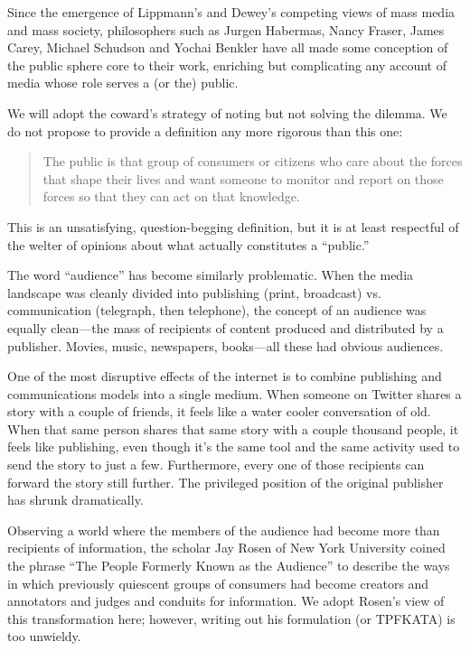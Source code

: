 Since the emergence of Lippmann’s and Dewey’s competing views of mass media
and mass society, philosophers such as Jurgen Habermas, Nancy Fraser, James
Carey, Michael Schudson and Yochai Benkler have all made some conception of
the public sphere core to their work, enriching but complicating any account of
media whose role serves a (or the) public.

We will adopt the coward’s strategy of noting but not solving the dilemma.
We do not propose to provide a definition any more rigorous than this one:

\begin{quote}The public is that group of consumers or citizens who care about the
forces that shape their lives and want someone to monitor and report
on those forces so that they can act on that knowledge.
\end{quote}

This is an unsatisfying, question-begging definition, but it is at least respectful of
the welter of opinions about what actually constitutes a ``public.''

The word ``audience'' has become similarly problematic. When the media landscape
was cleanly divided into publishing (print, broadcast) vs. communication
(telegraph, then telephone), the concept of an audience was equally clean—the
mass of recipients of content produced and distributed by a publisher. Movies,
music, newspapers, books—all these had obvious audiences.

One of the most disruptive effects of the internet is to combine publishing and
communications models into a single medium. When someone on Twitter shares
a story with a couple of friends, it feels like a water cooler conversation of old.
When that same person shares that same story with a couple thousand people,
it feels like publishing, even though it’s the same tool and the same activity used
to send the story to just a few. Furthermore, every one of those recipients can
forward the story still further. The privileged position of the original publisher
has shrunk dramatically.

Observing a world where the members of the audience had become more than
recipients of information, the scholar Jay Rosen of New York University coined
the phrase ``The People Formerly Known as the Audience'' to describe the ways
in which previously quiescent groups of consumers had become creators and
annotators and judges and conduits for information. We adopt Rosen’s view of
this transformation here; however, writing out his formulation (or TPFKATA) is
too unwieldy.

